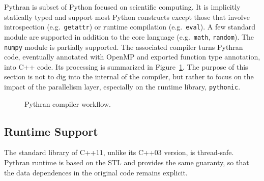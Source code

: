 \documentclass{llncs}
\begin{document}
Pythran is subset of Python focused on scientific computing. It is implicitly
statically typed and support most Python constructs except those that involve
introspection (e.g.\ \texttt{getattr}) or runtime compilation (e.g.\
\texttt{eval}). A few standard module are supported in addition to the core
language (e.g.\ \texttt{math}, \texttt{random}). The \texttt{numpy} module is
partially supported. The associated compiler turns Pythran code, eventually
annotated with OpenMP and exported function type annotation, into C++ code. Its
processing is summarized in Figure~\ref{fig:pythran-compiler}. The purpose of
this section is not to dig into the internal of the compiler, but rather to
focus on the impact of the parallelism layer, especially on the runtime library,
\texttt{pythonic}.

\begin{figure}

\centering
{}
\caption{Pythran compiler workflow.}
\label{fig:pythran-compiler}
\end{figure}

\subsection{Runtime Support}

The standard library of C++11, unlike its C++03 version, is thread-safe. Pythran
runtime is based on the STL and provides the same guaranty, so that the data
dependences in the original code remains explicit.
\end{document}
